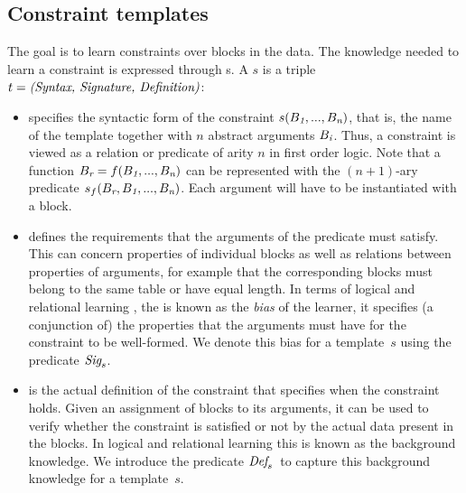 \newcommand{\sigc}{\ensuremath{\format{Sig}_s}}
\newcommand{\defc}{\ensuremath{\format{Def}_s}}

\subsection{Constraint templates}
The goal is to learn constraints over blocks in the data. The knowledge needed to learn a constraint is expressed through {\template}s.
%
A \template $s$ is a triple $t = \textit{(Syntax, Signature, Definition)}$:
\begin{itemize}
\item
\textit{\CName}  specifies the syntactic form of the constraint $s(B_{\textit{1}}, ...,B_{\textit{n}})$, that is, the name of the template together
with $n$ abstract arguments $B_{\textit{i}}$.
Thus, a constraint is viewed as a relation or predicate of arity $n$ in first order logic.
Note that a function $B_{\textit{r}}=f(B_{\textit{1}},...,B_{\textit{n}})$ can be represented with the $(n{+}1)$-ary predicate $s_f(B_{\textit{r}},B_{\textit{1}},...,B_{\textit{n}})$.
Each argument will have to be instantiated with a block.

\item \textit{\CSignature} defines the requirements that the arguments of the predicate must satisfy.
This can concern properties of individual blocks as well as relations between properties of arguments, for example that the corresponding blocks must belong to the same table or have equal length.
In terms of logical and relational learning \cite{luc_book}, the \CSignature is known as the {\em bias} of the learner, it specifies (a conjunction of) the properties that the arguments must have for the constraint to be well-formed.
We denote this bias for a template~$s$ using the predicate $\sigc$.
\item \textit{\CFunction} is the actual definition of the constraint that specifies when the constraint holds.
Given an assignment of blocks to its arguments, it can be used to verify whether the constraint is satisfied or not by the actual data present in the blocks. %
In logical and relational learning this is known as the background knowledge.
We introduce the predicate \defc~to capture this background knowledge for a template~$s$.
\end{itemize}

